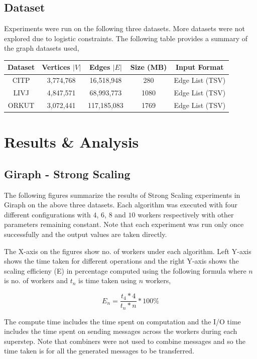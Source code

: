 \documentclass[11pt,a4paper,oneside]{article}
\begin{document}
    \subsection{Dataset}
    Experiments were run on the following three datasets. More datasets were not explored due to logistic constraints. The following table provides a summary of the graph datasets used,
    \begin{center}
    \begin{tabular}{|c|c|c|c|c|}
    	\hline 
    	\textbf{Dataset} & \textbf{Vertices $|V|$}  & \textbf{Edges $|E|$} & \textbf{Size (MB)} & \textbf{Input Format}\\
    	\hline
    	CITP & 3,774,768 & 16,518,948 & 280 & Edge List (TSV) \\
    	\hline
    	LIVJ & 4,847,571 & 68,993,773 & 1080 & Edge List (TSV) \\
    	\hline
    	ORKUT & 3,072,441 & 117,185,083 & 1769 & Edge List (TSV)\\
    	\hline
    \end{tabular}
    \end{center}
    	
    \section{Results \& Analysis}
    
    \subsection{Giraph - Strong Scaling}
    
    The following figures summarize the results of Strong Scaling experiments in Giraph on the above three datasets. Each algorithm was executed with four different configurations with $4$, $6$, $8$ and $10$ workers respectively with other parameters remaining constant. Note that each experiment was run only once successfully and the output values are taken directly. 
    
    The X-axis on the figures show no. of workers under each algorithm. Left Y-axis shows the time taken for different operations and the right Y-axis shows the scaling efficieny (E) in percentage computed using the following formula where $n$ is no. of workers and $t_n$ is time taken using $n$ workers,
    
    $$E_n = \frac{t_4 * 4}{t_n * n}*100\%$$
    
    The compute time includes the time spent on computation and the I/O time includes the time spent on sending messages across the workers during each superstep. Note that combiners were not used to combine messages and so the time taken is for all the generated messages to be transferred.
    
\end{document}
